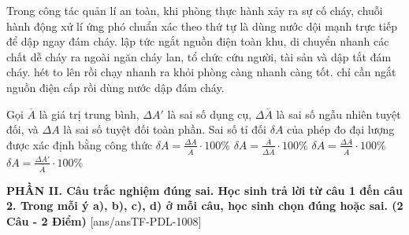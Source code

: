 \begin{ex}%
	Trong công tác quản lí an toàn, khi phòng thực hành xảy ra sự cố cháy, chuỗi hành động xử lí ứng phó chuẩn xác theo thứ tự là
	\choice
	{dùng nước dội mạnh trực tiếp để dập ngay đám cháy.}
	{\True lập tức ngắt nguồn điện toàn khu, di chuyển nhanh các chất dễ cháy ra ngoài ngăn cháy lan, tổ chức cứu người, tài sản và dập tắt đám cháy.}
	{hét to lên rồi chạy nhanh ra khỏi phòng càng nhanh càng tốt.}
	{chỉ cần ngắt nguồn điện cấp rồi dùng nước dập đám cháy.}
\end{ex}

\begin{ex}%
	Gọi $\overline{A}$ là giá trị trung bình, $\Delta A'$ là sai số dụng cụ, $\Delta \overline{A}$ là sai số ngẫu nhiên tuyệt đối, và $\Delta A$ là sai số tuyệt đối toàn phần. Sai số tỉ đối $\delta A$ của phép đo đại lượng được xác định bằng công thức
	\choice
	{\True $\delta A = \frac{\Delta A}{\overline{A}} \cdot 100\%$}
	{$\delta A = \frac{\overline{A}}{\Delta \overline{A}} \cdot 100\%$}
	{$\delta A = \frac{\Delta \overline{A}}{\overline{A}} \cdot 100\%$}
	{$\delta A = \frac{\Delta A'}{\overline{A}} \cdot 100\%$}
\end{ex}


\noindent \textbf{PHẦN II. Câu trắc nghiệm đúng sai. Học sinh trả lời từ câu 1 đến câu 2. Trong mỗi ý a), b), c), d) ở mỗi câu, học sinh chọn đúng hoặc sai. (2 Câu - 2 Điểm)}
[ans/ansTF-PDL-1008]

